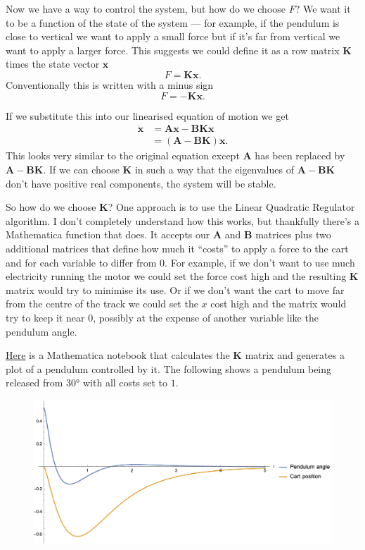 \documentclass{article}
\renewcommand{\vec}[1]{\boldsymbol{\mathbf{#1}}}
\newcommand{\dvec}[1]{\dot{\vec{#1}}}
\begin{document}
Now we have a way to control the system, but how do we choose $F$? We want it to be a function of the state of the system — for example, if the pendulum is close to vertical we want to apply a small force but if it's far from vertical we want to apply a larger force. This suggests we could define it as a row matrix $\vec{K}$ times the state vector $\vec{x}$ \[F = \vec{K} \vec{x}.\] Conventionally this is written with a minus sign \[F = -\vec{K} \vec{x}.\]

If we substitute this into our linearised equation of motion we get \begin{align*}
  \dvec{x} & = \vec{A} \vec{x} - \vec{B} \vec{K} \vec{x} \\
           & = (\vec{A} - \vec{B} \vec{K}) \vec{x}.
\end{align*} This looks very similar to the original equation except $\vec{A}$ has been replaced by $\vec{A} - \vec{B} \vec{K}$. If we can choose $\vec{K}$ in such a way that the eigenvalues of $\vec{A} - \vec{B} \vec{K}$ don't have positive real components, the system will be stable.

So how do we choose $\vec{K}$? One approach is to use the Linear Quadratic Regulator algorithm. I don't completely understand how this works, but thankfully there's a Mathematica function that does. It accepts our $\vec{A}$ and $\vec{B}$ matrices plus two additional matrices that define how much it ``costs'' to apply a force to the cart and for each variable to differ from $0$. For example, if we don't want to use much electricity running the motor we could set the force cost high and the resulting $\vec{K}$ matrix would try to minimise its use. Or if we don't want the cart to move far from the centre of the track we could set the $x$ cost high and the matrix would try to keep it near $0$, possibly at the expense of another variable like the pendulum angle.

\href{https://github.com/chrisdoble/self-balancing-inverted-pendulum/blob/master/notebooks/controlled.nb}{Here} is a Mathematica notebook that calculates the $\vec{K}$ matrix and generates a plot of a pendulum controlled by it. The following shows a pendulum being released from $\ang{30}$ with all costs set to $1$.

\begin{figure}[H]
  \centering
  \includegraphics[width=\textwidth]{controlled}
\end{figure}
\end{document}
